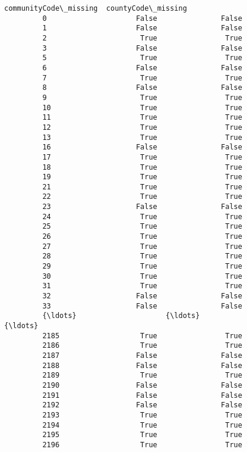 \documentclass[11pt]{llncs}
\begin{document}
\begin{Verbatim}[commandchars=\\\{\}]
               communityCode\_missing  countyCode\_missing  
         0                     False               False  
         1                     False               False  
         2                      True                True  
         3                     False               False  
         5                      True                True  
         6                     False               False  
         7                      True                True  
         8                     False               False  
         9                      True                True  
         10                     True                True  
         11                     True                True  
         12                     True                True  
         13                     True                True  
         16                    False               False  
         17                     True                True  
         18                     True                True  
         19                     True                True  
         21                     True                True  
         22                     True                True  
         23                    False               False  
         24                     True                True  
         25                     True                True  
         26                     True                True  
         27                     True                True  
         28                     True                True  
         29                     True                True  
         30                     True                True  
         31                     True                True  
         32                    False               False  
         33                    False               False  
         {\ldots}                     {\ldots}                 {\ldots}  
         2185                   True                True  
         2186                   True                True  
         2187                  False               False  
         2188                  False               False  
         2189                   True                True  
         2190                  False               False  
         2191                  False               False  
         2192                  False               False  
         2193                   True                True  
         2194                   True                True  
         2195                   True                True  
         2196                   True                True  

\end{Verbatim}
\end{document}
